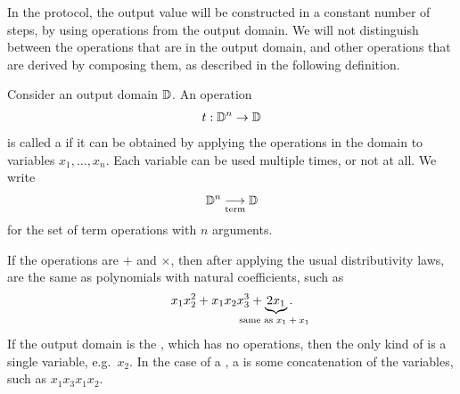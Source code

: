 In the protocol, the output value will be constructed in a constant number of
steps, by using operations from the output domain. We will not distinguish
between the operations that are in the output domain, and other operations
that are derived by composing them, as described in the following definition.

\begin{definition}\label{def:term-operations}
    Consider an output domain $\mathbb D$. An operation 
    \begin{align*}
    t : \mathbb D^n \to \mathbb D
    \end{align*}
    is called a  if it can be obtained by applying the operations in the domain to variables $x_1,\ldots,x_n$. Each variable can be used multiple times, or not at all.  We write 
    \begin{align*}
    \mathbb D^n \underset{\text{term}}{\longrightarrow} \mathbb D
    \end{align*}
    for the set of term operations with $n$ arguments.
\end{definition}

\begin{myexample}
  If the operations are $+$ and $\times$, then after applying the usual distributivity laws,   are the same as polynomials with natural coefficients, such as 
\begin{align*}
x_1x_2^2 + x_1x_2x_3^3  + \myunderbrace{2x_1}{same as $x_1 + x_1$}.
\end{align*}
If the output domain is the , which has no operations, then the only kind of  is a single variable, e.g.~$x_2$.  In the case of a , a  is some concatenation of the variables, such as $x_1 x_3 x_1 x_2$.
\end{myexample}



